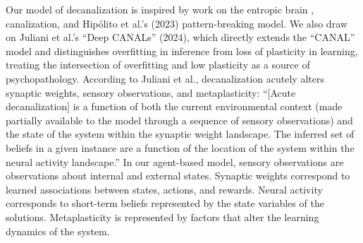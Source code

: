 \documentclass[12pt,fleqn]{article}
\begin{document}
Our model of decanalization is inspired by work on the entropic brain \cite{carhart-harris_entropic_2014,carhart-harris_entropic_2018}, canalization, and Hipólito et al.'s (2023) pattern-breaking model. We also draw on Juliani et al.'s “Deep CANALs” (2024), which directly extends the ``CANAL'' model \cite{carhart-harris_canalization_2023} and distinguishes overfitting in inference from loss of plasticity in learning, treating the intersection of overfitting and low plasticity as a source of psychopathology. According to Juliani et al., decanalization acutely alters synaptic weights, sensory observations, and metaplasticity: “[Acute decanalization] is a function of both the current environmental context (made partially available to the model through a sequence of sensory observations) and the state of the system within the synaptic weight landscape. The inferred set of beliefs in a given instance are a function of the location of the system within the neural activity landscape.” In our agent-based model, sensory observations are observations about internal and external states. Synaptic weights correspond to learned associations between states, actions, and rewards. Neural activity corresponds to short-term beliefs represented by the state variables of the solutions. Metaplasticity is represented by factors that alter the learning dynamics of the system.
\end{document}
